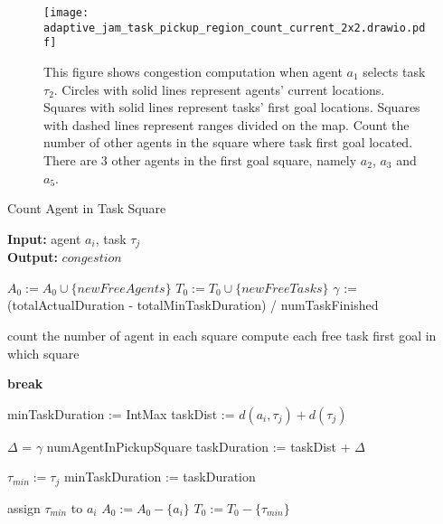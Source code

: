 \documentclass[letterpaper]{article} %
\begin{document}
\begin{figure}[t]
    \centering
    \texttt{[image: adaptive\_jam\_task\_pickup\_region\_count\_current\_2x2.drawio.pdf]}
    \caption{This figure shows congestion computation when agent $a_1$ selects task $\tau_2$. 
    Circles with solid lines represent agents' current locations.
    Squares with solid lines represent tasks' first goal locations.
    Squares with dashed lines represent ranges divided on the map.
    Count the number of other agents in the square where task first goal located. 
    There are 3 other agents in the first goal square, namely $a_2$, $a_3$ and $a_5$.
    }
    \label{fig:adaptive_jam_task_pickup_region_count_current}
\end{figure}


\begin{algorithm}
    \caption{Count Agent in Task Square}
    \label{alg:adaptive_jam_task_pickup_region_count_current} 
    \textbf{Input:} agent $a_i$, task $\tau_j$ \\
    \textbf{Output:} $congestion$
    \begin{algorithmic}[1]

    \STATE $A_0 := A_0 \cup \{newFreeAgents\}$
    \STATE $T_0 := T_0 \cup \{newFreeTasks\}$
    \STATE $\gamma$ := (totalActualDuration - totalMinTaskDuration) / numTaskFinished
    
    \STATE count the number of agent in each square
    \STATE compute each free task first goal in which square
    
            \STATE \textbf{break}
        \ENDIF

        \STATE minTaskDuration := IntMax
            \STATE taskDist := $d(a_i, \tau_j) + d(\tau_j)$

            \STATE $\Delta$ = $\gamma$ numAgentInPickupSquare
            \STATE taskDuration := taskDist + $\Delta$

                \STATE $\tau_{min} := \tau_j$
                \STATE minTaskDuration := taskDuration
            \ENDIF
        \ENDFOR
        
        \STATE assign $\tau_{min}$ to $a_i$
        \STATE $ A_0 := A_0 - \{a_i\} $
        \STATE $ T_0 := T_0 - \{\tau_{min}\} $
    \ENDFOR

    \end{algorithmic}
\end{algorithm}
\end{document}
